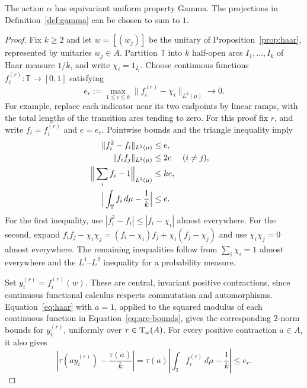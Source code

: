 \begin{proposition}\label{prop:gamma}
The action \(\alpha\) has equivariant uniform property Gamma.
The projections in Definition~\ref{def:gamma} can be chosen to sum to \(1\).
\end{proposition}

\begin{proof}
Fix \(k\geq2\) and let \(w=[(w_j)]\) be the unitary of
Proposition~\ref{prop:haar}, represented by unitaries \(w_j\in A\).
Partition \(\mathbb T\) into \(k\) half-open arcs \(I_1,\ldots,I_k\)
of Haar measure \(1/k\), and write \(\chi_i=1_{I_i}\).
Choose continuous functions \(f_i^{(r)}:\mathbb T\to[0,1]\) satisfying
\[
 e_r:=\max_{1\leq i\leq k}\|f_i^{(r)}-\chi_i\|_{L^2(\mu)}
   \longrightarrow0.
\]
For example, replace each indicator near its two endpoints by linear
ramps, with the total lengths of the transition arcs tending to zero.
For this proof fix \(r\), and write \(f_i=f_i^{(r)}\) and \(e=e_r\).
Pointwise bounds and the triangle inequality imply
\begin{align}
 \|f_i^2-f_i\|_{L^2(\mu)}&\leq e,\label{eq:arc-bounds}\\
 \|f_i f_j\|_{L^2(\mu)}&\leq2e &&(i\ne j),\notag\\
 \Big\|\sum_i f_i-1\Big\|_{L^2(\mu)}&\leq ke,\notag\\
 \Big|\int_{\mathbb T} f_i\,d\mu-\frac1k\Big|&\leq e.\notag
\end{align}
For the first inequality, use
\(|f_i^2-f_i|\leq|f_i-\chi_i|\) almost everywhere.
For the second, expand
\(f_i f_j-\chi_i\chi_j=(f_i-\chi_i)f_j+\chi_i(f_j-\chi_j)\)
and use \(\chi_i\chi_j=0\) almost everywhere.
The remaining inequalities follow from \(\sum_i\chi_i=1\) almost
everywhere and the \(L^1\)--\(L^2\) inequality for a probability measure.

Set \(y_i^{(r)}=f_i^{(r)}(w)\).
These are central, invariant positive contractions, since continuous
functional calculus respects commutation and automorphisms.
Equation~\eqref{eq:haar} with \(a=1\), applied to the squared modulus
of each continuous function in Equation~\eqref{eq:arc-bounds},
gives the corresponding \(2\)-norm bounds for \(y_i^{(r)}\),
uniformly over \(\tau\in\operatorname{T}_\omega(A)\).
For every positive contraction \(a\in A\), it also gives
\begin{equation}\label{eq:arc-weighted}
 \left|\tau(a y_i^{(r)})-\frac{\tau(a)}k\right|
   =\tau(a)\left|\int_{\mathbb T}f_i^{(r)}\,d\mu-\frac1k\right|
   \leq e_r .
\end{equation}


\end{proof}
